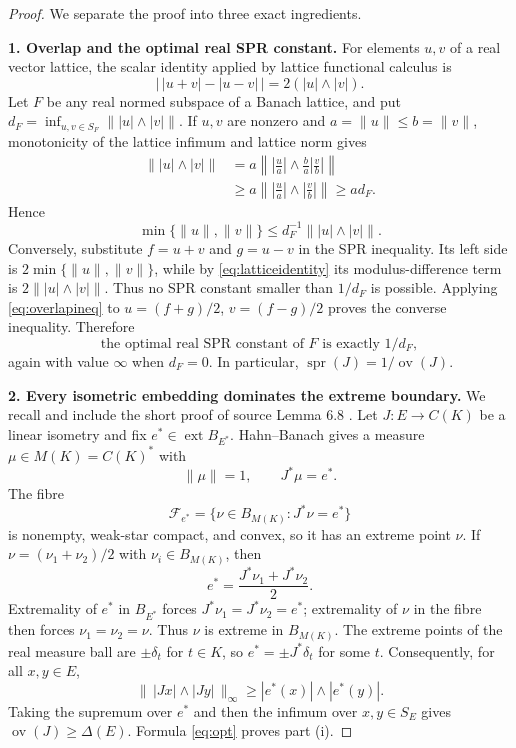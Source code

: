 \documentclass[11pt]{article}
\newcommand{\ext}{\operatorname{ext}}
\newcommand{\spr}{\operatorname{spr}}
\newcommand{\ov}{\operatorname{ov}}
\begin{document}
\begin{proof}
We separate the proof into three exact ingredients.

\medskip
\noindent\textbf{1. Overlap and the optimal real SPR constant.}
For elements $u,v$ of a real vector lattice, the scalar identity applied by
lattice functional calculus is
\begin{equation}\label{eq:latticeidentity}
 \bigl|\,|u+v|-|u-v|\,\bigr|=2(|u|\wedge|v|).
\end{equation}
Let $F$ be any real normed subspace of a Banach lattice, and put
$d_F=\inf_{u,v\in S_F}\||u|\wedge|v|\|$.  If $u,v$ are nonzero and
$a=\|u\|\leq b=\|v\|$, monotonicity of the lattice infimum and lattice norm
gives
\begin{align*}
 \||u|\wedge|v|\|
 &=a\left\|\left|\frac ua\right|
      \wedge\frac ba\left|\frac vb\right|\right\|\\
 &\geq a\left\|\left|\frac ua\right|
      \wedge\left|\frac vb\right|\right\|
 \geq a d_F.
\end{align*}
Hence
\begin{equation}\label{eq:overlapineq}
 \min\{\|u\|,\|v\|\}
 \leq d_F^{-1}\||u|\wedge|v|\|.
\end{equation}
Conversely, substitute $f=u+v$ and $g=u-v$ in the SPR inequality.  Its
left side is $2\min\{\|u\|,\|v\|\}$, while by
\eqref{eq:latticeidentity} its modulus-difference term is
$2\||u|\wedge|v|\|$.  Thus no SPR constant smaller than $1/d_F$ is possible.
Applying \eqref{eq:overlapineq} to
$u=(f+g)/2$, $v=(f-g)/2$ proves the converse inequality.  Therefore
\begin{equation}\label{eq:opt}
 \text{the optimal real SPR constant of }F\text{ is exactly }1/d_F,
\end{equation}
again with value $\infty$ when $d_F=0$.  In particular,
$\spr(J)=1/\ov(J)$.

\medskip
\noindent\textbf{2. Every isometric embedding dominates the extreme
boundary.}
We recall and include the short proof of source Lemma 6.8 \cite[Lemma 6.8]{FOPT}.
Let $J:E\to C(K)$ be a linear isometry and fix
$e^*\in\ext B_{E^*}$.  Hahn--Banach gives a measure
$\mu\in M(K)=C(K)^*$ with
\[
 \|\mu\|=1,
 \qquad J^*\mu=e^*.
\]
The fibre
\[
 \mathcal F_{e^*}=\{\nu\in B_{M(K)}:J^*\nu=e^*\}
\]
is nonempty, weak-star compact, and convex, so it has an extreme point $\nu$.
If $\nu=(\nu_1+\nu_2)/2$ with $\nu_i\in B_{M(K)}$, then
\[
 e^*=\frac{J^*\nu_1+J^*\nu_2}{2}.
\]
Extremality of $e^*$ in $B_{E^*}$ forces
$J^*\nu_1=J^*\nu_2=e^*$; extremality of $\nu$ in the fibre then forces
$\nu_1=\nu_2=\nu$.  Thus $\nu$ is extreme in $B_{M(K)}$.  The extreme
points of the real measure ball are $\pm\delta_t$ for $t\in K$, so
$e^*=\pm J^*\delta_t$ for some $t$.  Consequently, for all $x,y\in E$,
\[
 \bigl\|\,|Jx|\wedge|Jy|\,\bigr\|_\infty
 \geq |e^*(x)|\wedge|e^*(y)|.
\]
Taking the supremum over $e^*$ and then the infimum over $x,y\in S_E$ gives
$\ov(J)\geq\Delta(E)$.  Formula \eqref{eq:opt} proves part (i).


\end{proof}
\end{document}
